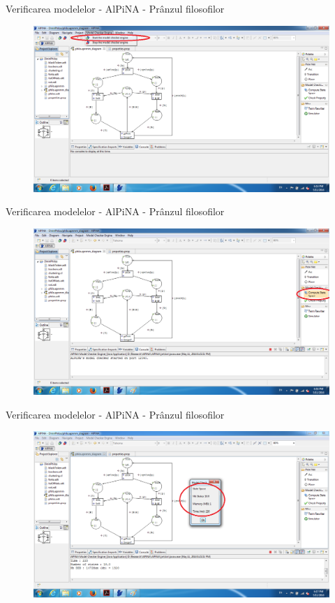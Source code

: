 \documentclass{beamer}
\begin{document}
\begin{frame}{Verificarea modelelor - AlPiNA - Prânzul filosofilor}
\begin{figure}
\centering
\includegraphics[scale=0.32]{images/alpina1}
\end{figure}
\end{frame}



\begin{frame}{Verificarea modelelor - AlPiNA - Prânzul filosofilor}
\begin{figure}
\centering
\includegraphics[scale=0.32]{images/alpina2}
\end{figure}
\end{frame}



\begin{frame}{Verificarea modelelor - AlPiNA - Prânzul filosofilor}
\begin{figure}
\centering
\includegraphics[scale=0.32]{images/alpina3}
\end{figure}
\end{frame}
\end{document}
